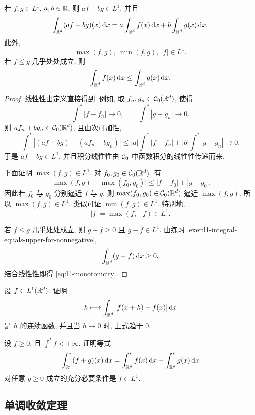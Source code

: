 \begin{thm}[线性、格运算与单调性]
	\label{thm:basic-properties-l1}
	若 \(f,g\in L^1\), \(a,b\in\mathbb{R}\), 则 \(af+bg\in L^1\), 并且
	\begin{equation}
		\int_{\mathbb{R}^d}(af+bg)(x)\,\dd x
		=a\int_{\mathbb{R}^d}f(x)\,\dd x
		+b\int_{\mathbb{R}^d}g(x)\,\dd x.
		\label{eq:l1-linearity}
	\end{equation}
	此外,
	\[
	\max(f,g),\ \min(f,g),\ |f|\in L^1.
	\]
	若 \(f\leq g\) 几乎处处成立, 则
	\begin{equation}
		\int_{\mathbb{R}^d}f(x)\,\dd x
		\leq
		\int_{\mathbb{R}^d}g(x)\,\dd x.
		\label{eq:l1-monotonicity}
	\end{equation}
\end{thm}

\begin{proof}
	线性性由定义直接得到. 例如, 取 \(f_n,g_n\in\mathcal{C}_0(\mathbb{R}^d)\), 使得
	\[
	\int^*|f-f_n|\to0,
	\qquad
	\int^*|g-g_n|\to0.
	\]
	则 \(af_n+bg_n\in\mathcal{C}_0(\mathbb{R}^d)\), 且由次可加性,
	\[
	\int^*|(af+bg)-(af_n+bg_n)|
	\leq |a|\int^*|f-f_n|+|b|\int^*|g-g_n|\to0.
	\]
	于是 \(af+bg\in L^1\), 并且积分线性性由 \(\mathcal{C}_0\) 中函数积分的线性性传递而来.
	
	下面证明 \(\max(f,g)\in L^1\). 对 \(f_0,g_0\in\mathcal{C}_0(\mathbb{R}^d)\), 有
	\[
	\bigl|\max(f,g)-\max(f_0,g_0)\bigr|
	\leq |f-f_0|+|g-g_0|.
	\]
	因此若 \(f_0\) 与 \(g_0\) 分别逼近 \(f\) 与 \(g\), 则 \(\max(f_0,g_0)\in\mathcal{C}_0(\mathbb{R}^d)\) 逼近 \(\max(f,g)\). 所以 \(\max(f,g)\in L^1\). 类似可证 \(\min(f,g)\in L^1\). 特别地,
	\[
	|f|=\max(f,-f)\in L^1.
	\]
	
	若 \(f\leq g\) 几乎处处成立, 则 \(g-f\geq0\) 且 \(g-f\in L^1\). 由练习 \ref{exer:l1-integral-equals-upper-for-nonnegative},
	\[
	\int_{\mathbb{R}^d}(g-f)\,\dd x\geq0.
	\]
	结合线性性即得 \eqref{eq:l1-monotonicity}.
\end{proof}

\begin{exer}\label{exer:l1-translation-continuity}
	设 \(f\in L^1(\mathbb{R}^d)\). 证明
	\[
	h\longmapsto \int_{\mathbb{R}^d}|f(x+h)-f(x)|\,\dd x
	\]
	是 \(h\) 的连续函数, 并且当 \(h\to0\) 时, 上式趋于 \(0\).
\end{exer}

\begin{exer}\label{exer:linearity-characterizes-l1-positive}
	设 \(f\geq0\), 且 \(\int^* f<+\infty\). 证明等式
	\[
	\int_{\mathbb{R}^d}^{*}(f+g)(x)\,\dd x
	=
	\int_{\mathbb{R}^d}^{*}f(x)\,\dd x+
	\int_{\mathbb{R}^d}^{*}g(x)\,\dd x
	\]
	对任意 \(g\geq0\) 成立的充分必要条件是 \(f\in L^1\).
\end{exer}

\subsection{单调收敛定理}


